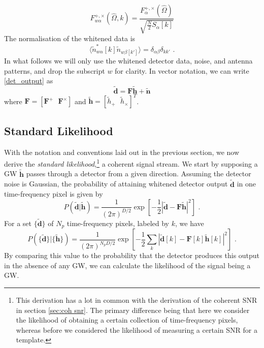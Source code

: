 \documentclass[11pt]{cuthesis}
\newcommand{\fs}{\text{ .}}
\newcommand{\tbd}{\tilde{\textbf{d}}}
\newcommand{\tbh}{\tilde{\textbf{h}}}
\begin{document}
\begin{equation}
F^{+,\times}_{w\alpha}(\hat{\Omega},k)=\frac{F^{+,\times}_\alpha (\hat{\Omega})}{\sqrt{\frac{N}{2}S_\alpha [k]}}
\end{equation}
The normalisation of the whitened data is 
\begin{equation}
\langle  \tilde{n}^*_{w\alpha} [k] \tilde{n}_{w\beta [k']}  \rangle = \delta _{\alpha \beta} \delta _{k k'}  \fs
\end{equation}
In what follows we will only use the whitened detector data, noise, and antenna patterns, and drop the subscript $w$ for clarity. In vector notation, we can write \ref{det_output} as
\begin{equation}
\tilde{\textbf{d}}=\textbf{F}\tilde{\textbf{h}}+\tilde{\textbf{n}} 
\end{equation}
where $\textbf{F}=[\textbf{F}^+ \:\:\:\textbf{F}^\times]$ and $\tilde{\textbf{h}}=[\tilde{h}_+ \:\:\: \tilde{h}_\times]^T$.

\subsection{Standard Likelihood}
With the notation and conventions laid out in the previous section, we now derive the \textit{standard likelihood},\footnote{This derivation has a lot in common with the derivation of the coherent SNR in section \ref{sec:coh snr}. The primary difference being that here we consider the likelihood of obtaining a certain collection of time-frequency pixels, whereas before we considered the likelihood of measuring a certain SNR for a template.} a coherent signal stream. We start by supposing a GW $\tilde{\textbf{h}}$ passes through a detector from a given direction. Assuming the detector noise is Gaussian, the probability of attaining whitened detector output $\tilde{\textbf{d}}$ in one time-frequency pixel is given by
\begin{equation}
P(\tilde{\textbf{d}}|\tilde{\textbf{h}})=\frac{1}{(2\pi )^{D/2}}\exp \left[ -\frac{1}{2} \left| \tbd - \textbf{F} \tbh  \right|^2 \right] \fs
\end{equation}  
For a set $\{ \tbd \}$ of $N_p$ time-frequency pixels, labeled by $k$, we have
\begin{equation}
P(\{ \tilde{\textbf{d}} \}|\{ \tilde{\textbf{h}} \})=\frac{1}{(2\pi )^{N_p D/2}}\exp \left[- \frac{1}{2} \sum_k \left| \tbd [k] - \textbf{F}[k] \tbh [k]  \right|^2 \right] \fs
\end{equation}  
By comparing this value to the probability that the detector produces this output in the absence of any GW, we can calculate the likelihood of the signal being a GW. 
\end{document}
